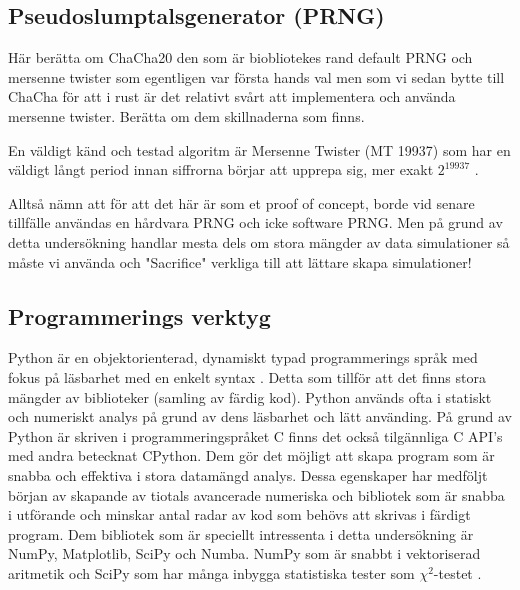 \documentclass[swedish,a4paper]{article}
\begin{document}
\subsection{Pseudoslumptalsgenerator (PRNG)}
\label{sec:prng}
Här berätta om ChaCha20 \parencite{chacha} den som är biobliotekes rand
\parencite{rand_crate} default PRNG och mersenne twister som egentligen var första
hands val
\parencite{mersenne_twister} men som vi sedan bytte till ChaCha för att i rust
är det relativt svårt att  implementera och använda mersenne twister. Berätta om
dem skillnaderna som finns.


En väldigt känd och testad algoritm är Mersenne Twister (MT 19937) som
har en väldigt långt period innan siffrorna börjar att upprepa sig, mer
exakt $2^{19937}$ \parencite{mersenne_twister}.

Alltså nämn att för att det här är som et proof of concept, borde vid
senare tillfälle användas en hårdvara PRNG och icke software PRNG.
Men på grund av detta undersökning handlar mesta dels om stora mängder av data
simulationer så måste vi använda och "Sacrifice" verkliga till att lättare
skapa simulationer!

\subsection{Programmerings verktyg}
\label{sec:verktyg}
Python är en objektorienterad, dynamiskt typad programmerings språk med
fokus på läsbarhet med en enkelt syntax \parencite{python}. Detta  som tillför att det finns stora
mängder av biblioteker (samling av färdig kod).
Python används ofta i statiskt och numeriskt analys på grund av dens
läsbarhet och lätt använding. På grund av Python är skriven i
programmeringspråket C finns det också tilgännliga C API's med andra
betecknat CPython. Dem gör det möjligt att skapa program som är snabba
och effektiva i stora datamängd analys. Dessa egenskaper har medföljt
början av skapande av tiotals avancerade numeriska och
bibliotek som är snabba i utförande och minskar antal radar av kod som
behövs att skrivas i färdigt program. Dem bibliotek som är speciellt
intressenta i detta undersökning är NumPy, Matplotlib, SciPy och Numba.
NumPy som är snabbt i vektoriserad aritmetik och SciPy som har många
inbygga statistiska tester som $\chi^2$-testet \parencite{numpy, scipy}.


\end{document}
